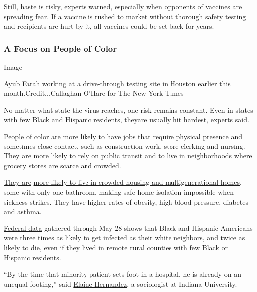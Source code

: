 Still, haste is risky, experts warned, especially
\href{https://www.nytimes3xbfgragh.onion/2020/07/18/health/coronavirus-anti-vaccine.html}{when
opponents of vaccines are spreading fear}. If a vaccine is rushed
\href{https://www.nytimes3xbfgragh.onion/2020/06/08/opinion/trump-coronavirus-vaccine.html}{to
market} without thorough safety testing and recipients are hurt by it,
all vaccines could be set back for years.

\hypertarget{a-focus-on-people-of-color}{%
\subsubsection{A Focus on People of
Color}\label{a-focus-on-people-of-color}}

Image

Ayub Farah working at a drive-through testing site in Houston earlier
this month.Credit...Callaghan O'Hare for The New York Times

No matter what state the virus reaches, one risk remains constant. Even
in states with few Black and Hispanic residents,
they\href{https://www.cdc.gov/coronavirus/2019-ncov/need-extra-precautions/racial-ethnic-minorities.html}{are
usually hit hardest}, experts said.

People of color are more likely to have jobs that require physical
presence and sometimes close contact, such as construction work, store
clerking and nursing. They are more likely to rely on public transit and
to live in neighborhoods where grocery stores are scarce and crowded.

\href{https://www.nytimes3xbfgragh.onion/interactive/2020/07/05/us/coronavirus-latinos-african-americans-cdc-data.html}{They
are}
\href{https://www.pewresearch.org/fact-tank/2018/04/05/a-record-64-million-americans-live-in-multigenerational-households/}{more
likely to live in crowded housing and multigenerational homes}, some
with only one bathroom, making safe home isolation impossible when
sickness strikes. They have higher rates of obesity, high blood
pressure, diabetes and asthma.

\href{https://www.nytimes3xbfgragh.onion/interactive/2020/07/05/us/coronavirus-latinos-african-americans-cdc-data.html}{Federal
data} gathered through May 28 shows that Black and Hispanic Americans
were three times as likely to get infected as their white neighbors, and
twice as likely to die, even if they lived in remote rural counties with
few Black or Hispanic residents.

``By the time that minority patient sets foot in a hospital, he is
already on an unequal footing,'' said
\href{https://www.newswise.com/coronavirus/iu-professor-available-to-discuss-social-bias-and-inequality-in-covid-crisis/?article_id=729760}{Elaine
Hernandez}, a sociologist at Indiana University.

